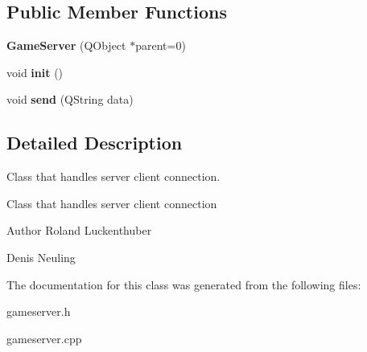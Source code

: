 \subsection*{\-Public \-Member \-Functions}
\begin{DoxyCompactItemize}
\item 
\hypertarget{classGameServer_a23246629b4e19dcd029ad89455147461}{{\bfseries \-Game\-Server} (\-Q\-Object $\ast$parent=0)}\label{classGameServer_a23246629b4e19dcd029ad89455147461}

\item 
\hypertarget{classGameServer_a65f06eb193e2ce2670f1b2f65c0a7469}{void {\bfseries init} ()}\label{classGameServer_a65f06eb193e2ce2670f1b2f65c0a7469}

\item 
\hypertarget{classGameServer_a58e009e4c2444745fb86a4085a0ab376}{void {\bfseries send} (\-Q\-String data)}\label{classGameServer_a58e009e4c2444745fb86a4085a0ab376}

\end{DoxyCompactItemize}


\subsection{\-Detailed \-Description}
\-Class that handles server client connection. 

\-Class that handles server client connection

\begin{DoxyAuthor}{\-Author}
\-Roland \-Luckenthuber 

\-Denis \-Neuling 
\end{DoxyAuthor}


\-The documentation for this class was generated from the following files\-:\begin{DoxyCompactItemize}
\item 
gameserver.\-h\item 
gameserver.\-cpp\end{DoxyCompactItemize}

